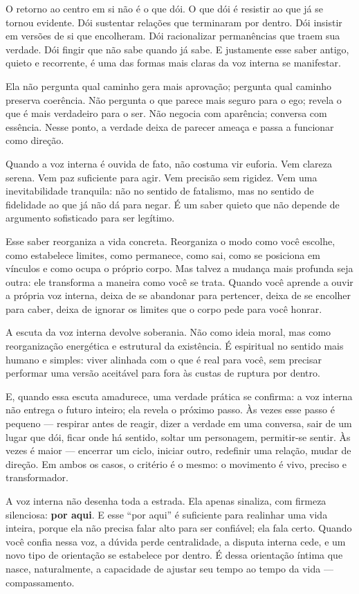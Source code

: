 \documentclass[12pt]{book}
\begin{document}
O retorno ao centro em si não é o que dói. O que dói é resistir ao que já se tornou evidente. Dói sustentar relações que terminaram por dentro. Dói insistir em versões de si que encolheram. Dói racionalizar permanências que traem sua verdade. Dói fingir que não sabe quando já sabe. E justamente esse saber antigo, quieto e recorrente, é uma das formas mais claras da voz interna se manifestar.

Ela não pergunta qual caminho gera mais aprovação; pergunta qual caminho preserva coerência. Não pergunta o que parece mais seguro para o ego; revela o que é mais verdadeiro para o ser. Não negocia com aparência; conversa com essência. Nesse ponto, a verdade deixa de parecer ameaça e passa a funcionar como direção.

Quando a voz interna é ouvida de fato, não costuma vir euforia. Vem clareza serena. Vem paz suficiente para agir. Vem precisão sem rigidez. Vem uma inevitabilidade tranquila: não no sentido de fatalismo, mas no sentido de fidelidade ao que já não dá para negar. É um saber quieto que não depende de argumento sofisticado para ser legítimo.

Esse saber reorganiza a vida concreta. Reorganiza o modo como você escolhe, como estabelece limites, como permanece, como sai, como se posiciona em vínculos e como ocupa o próprio corpo. Mas talvez a mudança mais profunda seja outra: ele transforma a maneira como você se trata. Quando você aprende a ouvir a própria voz interna, deixa de se abandonar para pertencer, deixa de se encolher para caber, deixa de ignorar os limites que o corpo pede para você honrar.

A escuta da voz interna devolve soberania. Não como ideia moral, mas como reorganização energética e estrutural da existência. É espiritual no sentido mais humano e simples: viver alinhada com o que é real para você, sem precisar performar uma versão aceitável para fora às custas de ruptura por dentro.

E, quando essa escuta amadurece, uma verdade prática se confirma: a voz interna não entrega o futuro inteiro; ela revela o próximo passo. Às vezes esse passo é pequeno — respirar antes de reagir, dizer a verdade em uma conversa, sair de um lugar que dói, ficar onde há sentido, soltar um personagem, permitir-se sentir. Às vezes é maior — encerrar um ciclo, iniciar outro, redefinir uma relação, mudar de direção. Em ambos os casos, o critério é o mesmo: o movimento é vivo, preciso e transformador.

A voz interna não desenha toda a estrada. Ela apenas sinaliza, com firmeza silenciosa: \textbf{por aqui}. E esse “por aqui” é suficiente para realinhar uma vida inteira, porque ela não precisa falar alto para ser confiável; ela fala certo. Quando você confia nessa voz, a dúvida perde centralidade, a disputa interna cede, e um novo tipo de orientação se estabelece por dentro. É dessa orientação íntima que nasce, naturalmente, a capacidade de ajustar seu tempo ao tempo da vida — compassamento.
\end{document}
